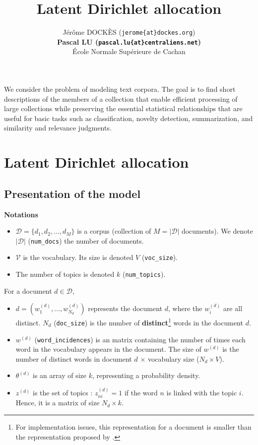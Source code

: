 \documentclass{article}
\title{Latent Dirichlet allocation}
\author{
J\'er\^ome DOCK\`ES (\texttt{jerome\{at\}dockes.org}) \\
\textbf{Pascal LU (\texttt{pascal.lu\{at\}centraliens.net})} \\
\'Ecole Normale Sup\'erieure de Cachan \\
}
\begin{document}
\maketitle

We consider the problem of modeling text corpora. The goal is to find short descriptions of the members of a collection that enable efficient processing of large collections while preserving the essential statistical relationships that are useful for basic tasks such as classification, novelty detection, summarization, and similarity and relevance judgments.

\section{Latent Dirichlet allocation}
\subsection{Presentation of the model}

\textbf{Notations}
\begin{itemize}
\setlength\itemsep{-0.2em}
  \item $\mathcal{D} = \{d_{1},d_{2}, \ldots, d_{M}\}$ is a corpus (collection of $M=|\mathcal{D}|$ documents). We denote $|\mathcal{D}|$ (\verb"num_docs") the number of documents.
  \item $\mathcal{V}$ is the vocabulary. Its size is denoted $V$ (\verb"voc_size").
  \item The number of topics is denoted $k$ (\verb"num_topics").
\end{itemize}

For a document $d \in \mathcal{D}$,
\begin{itemize}  
\setlength\itemsep{-0.2em}
  \item $d = (w_1^{(d)}, \ldots, w_{N_d}^{(d)})$ represents the document $d$, where the $w_i^{(d)}$ are all distinct. $N_d$ (\verb"doc_size") is the number of \textbf{distinct}\footnote{For implementation issues, this representation for a document is smaller than the representation proposed by \cite{BNJ03}.} words in the document $d$.
  \item $w^{(d)}$ (\verb"word_incidences") is an matrix containing the number of times each word in the vocabulary appears in the document. The size of $w^{(d)}$ is the number of distinct words in document $d$ $\times$ vocabulary size ($N_d \times V$).
 \item $\theta^{(d)}$ is an array of size $k$, representing a probability density.
 \item $z^{(d)}$ is the set of topics : $z_{ni}^{(d)} =  1$ if the word $n$ is linked with the topic $i$. Hence, it is a matrix of size $N_d \times k$.
\end{itemize}
\end{document}

